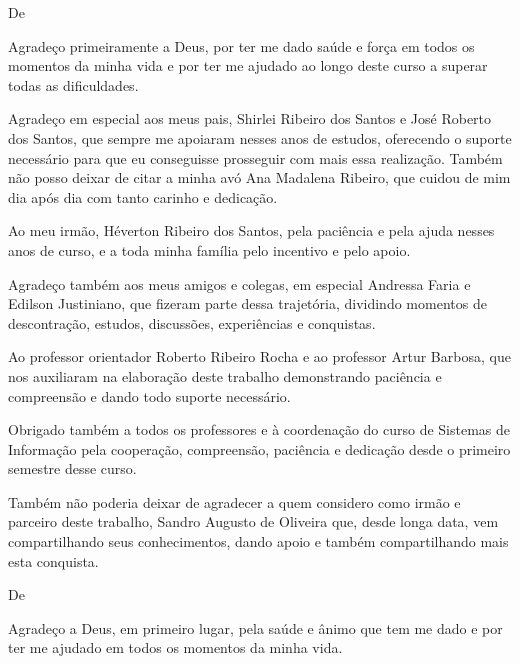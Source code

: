 \begin{agradecimentos}

De \imprimirAutorUm
\newline
\par Agradeço primeiramente a Deus, por ter me dado saúde e força em todos os 
momentos da minha vida e por ter me ajudado ao longo deste curso a superar todas 
as dificuldades. 

\par Agradeço em especial aos meus pais, Shirlei Ribeiro dos Santos e José Roberto dos 
Santos, que sempre me apoiaram nesses anos de estudos, oferecendo o suporte 
necessário para que eu conseguisse prosseguir com mais essa realização. Também 
não posso deixar de citar a minha avó Ana Madalena Ribeiro, que cuidou de mim dia 
após dia com tanto carinho e dedicação. 

\par Ao meu irmão, Héverton Ribeiro dos Santos, pela paciência e pela ajuda nesses anos 
de curso, e a toda minha família pelo incentivo e pelo apoio. 

\par Agradeço também aos meus amigos e colegas, em especial Andressa Faria e Edilson 
Justiniano, que fizeram parte dessa trajetória, dividindo momentos de descontração, 
estudos, discussões, experiências e conquistas. 

\par Ao professor orientador Roberto Ribeiro Rocha e ao professor Artur Barbosa, que nos 
auxiliaram na elaboração deste trabalho demonstrando paciência e compreensão e 
dando todo suporte necessário.

\par Obrigado também a todos os professores e à coordenação do curso de Sistemas
de Informação pela cooperação, compreensão, paciência e dedicação desde o 
primeiro semestre desse curso. 

\par Também não poderia deixar de agradecer a quem considero como irmão e parceiro 
deste trabalho, Sandro Augusto de Oliveira que, desde longa data, vem 
compartilhando seus conhecimentos, dando apoio e também compartilhando mais 
esta conquista.

\vspace*{\fill}
De \imprimirAutorDois
\newline
\par Agradeço a Deus, em primeiro lugar, pela saúde  e ânimo que tem me dado e
por ter me ajudado em todos os momentos da minha vida.


\end{agradecimentos}
